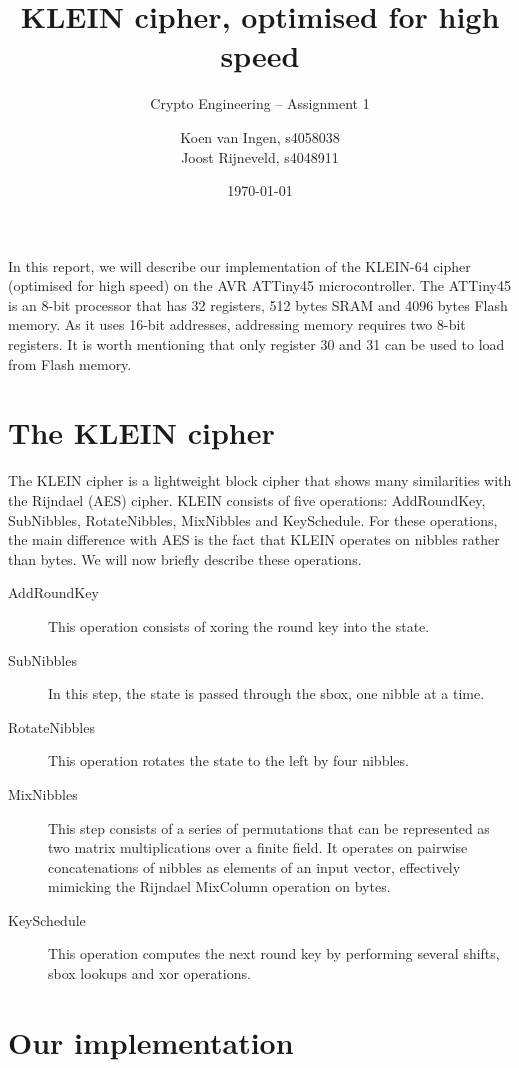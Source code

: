 \documentclass[a4paper]{article}
\title{KLEIN cipher, optimised for high speed}
\subtitle{Crypto Engineering -- Assignment 1}
\date{\monthdate\today}
\author{Koen van Ingen, s4058038\\
Joost Rijneveld, s4048911}
\begin{document}
\maketitle

In this report, we will describe our implementation of the KLEIN-64 cipher~\cite{gong2012klein} (optimised for high speed) on the AVR ATTiny45 microcontroller. The ATTiny45 is an 8-bit processor that has 32 registers, 512 bytes SRAM and 4096 bytes Flash memory. As it uses 16-bit addresses, addressing memory requires two 8-bit registers. It is worth mentioning that only register 30 and 31 can be used to load from Flash memory.

\section{The KLEIN cipher}

The KLEIN cipher is a lightweight block cipher that shows many similarities with the Rijndael (AES) cipher. KLEIN consists of five operations: AddRoundKey, SubNibbles, RotateNibbles, MixNibbles and KeySchedule. For these operations, the main difference with AES is the fact that KLEIN operates on nibbles rather than bytes. We will now briefly describe these operations. 

\begin{description}
	\item[AddRoundKey] This operation consists of xoring the round key into the state.
	\item[SubNibbles] In this step, the state is passed through the sbox, one nibble at a time.
	\item[RotateNibbles] This operation rotates the state to the left by four nibbles.
	\item[MixNibbles] This step consists of a series of permutations that can be represented as two matrix multiplications over a finite field. It operates on pairwise concatenations of nibbles as elements of an input vector, effectively mimicking the Rijndael MixColumn operation on bytes.
	\item[KeySchedule] This operation computes the next round key by performing several shifts, sbox lookups and xor operations.
\end{description}

\section{Our implementation}
\end{document}
